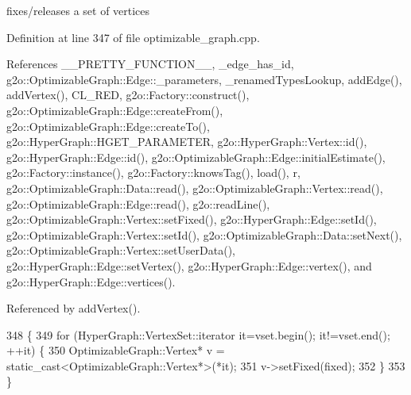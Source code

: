 fixes/releases a set of vertices 



Definition at line 347 of file optimizable\+\_\+graph.\+cpp.



References \+\_\+\+\_\+\+P\+R\+E\+T\+T\+Y\+\_\+\+F\+U\+N\+C\+T\+I\+O\+N\+\_\+\+\_\+, \+\_\+edge\+\_\+has\+\_\+id, g2o\+::\+Optimizable\+Graph\+::\+Edge\+::\+\_\+parameters, \+\_\+renamed\+Types\+Lookup, add\+Edge(), add\+Vertex(), C\+L\+\_\+\+R\+ED, g2o\+::\+Factory\+::construct(), g2o\+::\+Optimizable\+Graph\+::\+Edge\+::create\+From(), g2o\+::\+Optimizable\+Graph\+::\+Edge\+::create\+To(), g2o\+::\+Hyper\+Graph\+::\+H\+G\+E\+T\+\_\+\+P\+A\+R\+A\+M\+E\+T\+ER, g2o\+::\+Hyper\+Graph\+::\+Vertex\+::id(), g2o\+::\+Hyper\+Graph\+::\+Edge\+::id(), g2o\+::\+Optimizable\+Graph\+::\+Edge\+::initial\+Estimate(), g2o\+::\+Factory\+::instance(), g2o\+::\+Factory\+::knows\+Tag(), load(), r, g2o\+::\+Optimizable\+Graph\+::\+Data\+::read(), g2o\+::\+Optimizable\+Graph\+::\+Vertex\+::read(), g2o\+::\+Optimizable\+Graph\+::\+Edge\+::read(), g2o\+::read\+Line(), g2o\+::\+Optimizable\+Graph\+::\+Vertex\+::set\+Fixed(), g2o\+::\+Hyper\+Graph\+::\+Edge\+::set\+Id(), g2o\+::\+Optimizable\+Graph\+::\+Vertex\+::set\+Id(), g2o\+::\+Optimizable\+Graph\+::\+Data\+::set\+Next(), g2o\+::\+Optimizable\+Graph\+::\+Vertex\+::set\+User\+Data(), g2o\+::\+Hyper\+Graph\+::\+Edge\+::set\+Vertex(), g2o\+::\+Hyper\+Graph\+::\+Edge\+::vertex(), and g2o\+::\+Hyper\+Graph\+::\+Edge\+::vertices().



Referenced by add\+Vertex().


\begin{DoxyCode}
348 \{
349   \textcolor{keywordflow}{for} (HyperGraph::VertexSet::iterator it=vset.begin(); it!=vset.end(); ++it) \{
350     OptimizableGraph::Vertex* v = \textcolor{keyword}{static\_cast<}OptimizableGraph::Vertex*\textcolor{keyword}{>}(*it);
351     v->setFixed(fixed);
352   \}
353 \}
\end{DoxyCode}
